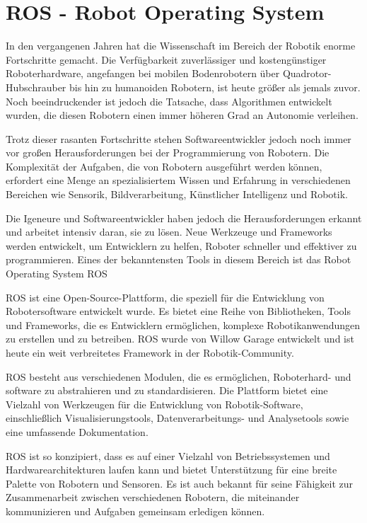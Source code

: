 \section{ROS - Robot Operating System} \label{ros:section}
In den vergangenen Jahren hat die Wissenschaft im Bereich der Robotik enorme Fortschritte gemacht. Die Verfügbarkeit zuverlässiger und kostengünstiger Roboterhardware, angefangen bei mobilen Bodenrobotern über Quadrotor-Hubschrauber bis hin zu humanoiden Robotern, ist heute größer als jemals zuvor. Noch beeindruckender ist jedoch die Tatsache, dass Algorithmen entwickelt wurden, die diesen Robotern einen immer höheren Grad an Autonomie verleihen.

Trotz dieser rasanten Fortschritte stehen Softwareentwickler jedoch noch immer vor großen Herausforderungen bei der Programmierung von Robotern. Die Komplexität der Aufgaben, die von Robotern ausgeführt werden können, erfordert eine Menge an spezialisiertem Wissen und Erfahrung in verschiedenen Bereichen wie Sensorik, Bildverarbeitung, Künstlicher Intelligenz und Robotik.

Die Igeneure und Softwareentwickler haben jedoch die Herausforderungen erkannt und arbeitet intensiv daran, sie zu lösen. Neue Werkzeuge und Frameworks werden entwickelt, um Entwicklern zu helfen, Roboter schneller und effektiver zu programmieren. Eines der bekanntensten Tools in diesem Bereich ist das Robot Operating System \ac{ROS}

\ac{ROS} ist eine Open-Source-Plattform, die speziell für die Entwicklung von Robotersoftware entwickelt wurde. Es bietet eine Reihe von Bibliotheken, Tools und Frameworks, die es Entwicklern ermöglichen, komplexe Robotikanwendungen zu erstellen und zu betreiben. \ac{ROS} wurde von Willow Garage entwickelt und ist heute ein weit verbreitetes Framework in der Robotik-Community.

\ac{ROS} besteht aus verschiedenen Modulen, die es ermöglichen, Roboterhard-  und software zu abstrahieren und zu standardisieren. Die Plattform bietet eine Vielzahl von Werkzeugen für die Entwicklung von Robotik-Software, einschließlich Visualisierungstools, Datenverarbeitungs- und Analysetools sowie eine umfassende Dokumentation.

\ac{ROS} ist so konzipiert, dass es auf einer Vielzahl von Betriebssystemen und Hardwarearchitekturen laufen kann und bietet Unterstützung für eine breite Palette von Robotern und Sensoren. Es ist auch bekannt für seine Fähigkeit zur Zusammenarbeit zwischen verschiedenen Robotern, die miteinander kommunizieren und Aufgaben gemeinsam erledigen können.

